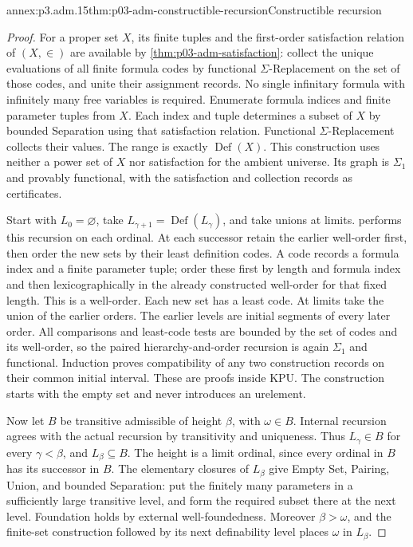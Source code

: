 \begin{annexitem}{annex:p3.adm.15}{thm:p03-adm-constructible-recursion}{Constructible recursion}
\begin{proof}
For a proper set \(X\), its finite tuples and the first-order
satisfaction relation of \((X,\in)\) are available by
\cref{thm:p03-adm-satisfaction}: collect the unique evaluations of
all finite formula codes by functional \(\Sigma\)-Replacement on
the set of those codes, and unite their assignment records. No single
infinitary formula with infinitely many free variables is required.
Enumerate formula indices and finite
parameter tuples from \(X\). Each index and tuple determines a subset
of \(X\) by bounded Separation using that satisfaction relation.
Functional \(\Sigma\)-Replacement collects their values. The range
is exactly \(\operatorname{Def}(X)\). This construction uses neither
a power set of \(X\) nor satisfaction for the ambient universe.
Its graph is \(\Sigma_1\) and provably functional, with the
satisfaction and collection records as certificates.

Start with \(L_0=\varnothing\), take
\(L_{\gamma+1}=\operatorname{Def}(L_\gamma)\), and take unions at
limits.  performs this recursion
on each ordinal. At each successor retain the earlier well-order first,
then order the new sets by their least definition codes. A code records
a formula index and a finite parameter tuple; order these first by
length and formula index and then lexicographically in the already
constructed well-order for that fixed length. This is a well-order.
Each new set has a least code. At limits take the union of the earlier
orders. The earlier levels are initial segments of every later order.
All comparisons and least-code tests are bounded by the set of codes
and its well-order, so the paired hierarchy-and-order recursion is
again \(\Sigma_1\) and functional. Induction proves compatibility of
any two construction records on their common initial interval. These
are proofs inside KPU. The construction starts with the empty set and
never introduces an urelement.

Now let \(B\) be transitive admissible of height \(\beta\), with
\(\omega\in B\). Internal recursion agrees with the actual recursion
by transitivity and uniqueness. Thus \(L_\gamma\in B\) for every
\(\gamma<\beta\), and \(L_\beta\subseteq B\). The height is a
limit ordinal, since every ordinal in \(B\) has its successor in
\(B\). The elementary closures of \(L_\beta\) give Empty Set,
Pairing, Union, and bounded Separation: put the finitely many parameters
in a sufficiently large transitive level, and form the required
subset there at the next level. Foundation holds by external
well-foundedness. Moreover \(\beta>\omega\), and the finite-set
construction followed by its next definability level places
\(\omega\) in \(L_\beta\).


\end{proof}
\end{annexitem}
